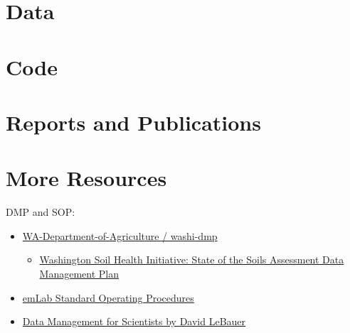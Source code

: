 \documentclass[
  letterpaper,
  DIV=11,
  numbers=noendperiod]{scrreprt}
\providecommand{\tightlist}{%
  \setlength{\itemsep}{0pt}\setlength{\parskip}{0pt}}\usepackage{longtable,booktabs,array}
\begin{document}

\chapter*{Data}\label{sec-data}



\chapter*{Code}\label{sec-code}



\chapter*{Reports and Publications}\label{sec-reports-and-publications}



\chapter*{More Resources}\label{sec-more-resources}


DMP and SOP:

\begin{itemize}
\tightlist
\item
  \href{https://github.com/WA-Department-of-Agriculture/washi-dmp}{WA-Department-of-Agriculture
  / washi-dmp}

  \begin{itemize}
  \tightlist
  \item
    \href{https://wa-department-of-agriculture.github.io/washi-dmp/}{Washington
    Soil Health Initiative: State of the Soils Assessment Data
    Management Plan}
  \end{itemize}
\item
  \href{https://emlab-ucsb.github.io/SOP/}{emLab Standard Operating
  Procedures}
\item
  \href{https://www.youtube.com/watch?v=m29u6OniOGQ&t=3446s}{Data
  Management for Scientists by David LeBauer}
\end{itemize}
\end{document}
